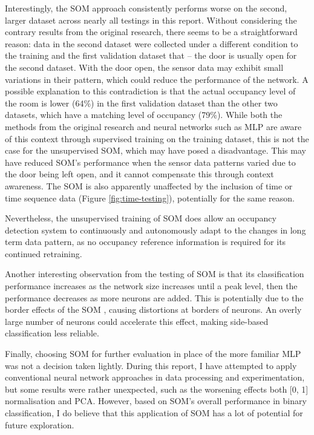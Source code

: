 \documentclass[10pt, oneside]{article}
\begin{document}
Interestingly, the SOM approach consistently performs worse on the second, larger dataset across nearly all testings in this report. Without considering the contrary results from the original research, there seems to be a straightforward reason: data in the second dataset were collected under a different condition to the training and the first validation dataset that -- the door is usually open for the second dataset. With the door open, the sensor data may exhibit small variations in their pattern, which could reduce the performance of the network. A possible explanation to this contradiction is that the actual occupancy level of the room is lower (64\%) in the first validation dataset than the other two datasets, which have a matching level of occupancy (79\%). While both the methods from the original research and neural networks such as MLP are aware of this context through supervised training on the training dataset, this is not the case for the unsupervised SOM, which may have posed a disadvantage. This may have reduced SOM's performance when the sensor data patterns varied due to the door being left open, and it cannot compensate this through context awareness. The SOM is also apparently unaffected by the inclusion of time or time sequence data (Figure \ref{fig:time-testing}), potentially for the same reason.

Nevertheless, the unsupervised training of SOM does allow an occupancy detection system to continuously and autonomously adapt to the changes in long term data pattern, as no occupancy reference information is required for its continued retraining. 

Another interesting observation from the testing of SOM is that its classification performance increases as the network size increases until a peak level, then the performance decreases as more neurons are added. This is potentially due to the border effects of the SOM \cite[Sec. 4.5]{kohonen2014matlab}, causing distortions at borders of neurons. An overly large number of neurons could accelerate this effect, making side-based classification less reliable.

Finally, choosing SOM for further evaluation in place of the more familiar MLP was not a decision taken lightly. During this report, I have attempted to apply conventional neural network approaches in data processing and experimentation, but some results were rather unexpected, such as the worsening effects both [0, 1] normalisation and PCA. However, based on SOM's overall performance in binary classification, I do believe that this application of SOM has a lot of potential for future exploration.
\end{document}
